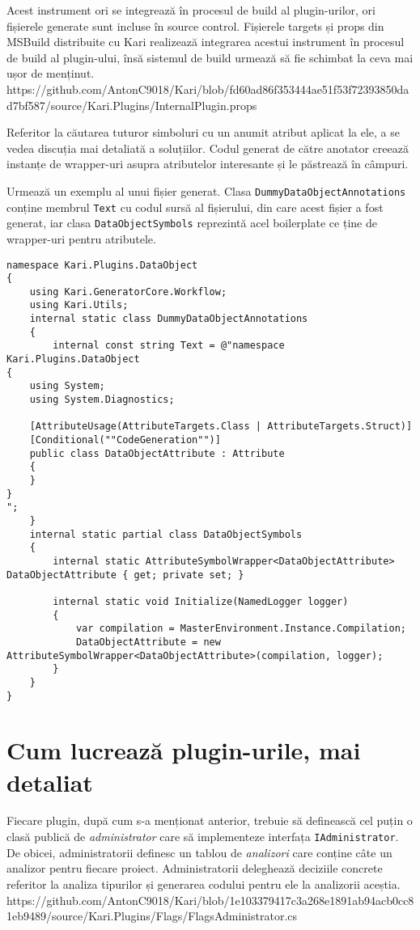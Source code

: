 \documentclass[a4paper,12pt]{report}
\begin{document}
Acest instrument ori se integrează în procesul de build al plugin-urilor, ori fișierele generate sunt incluse în source control.
Fișierele targets și props din MSBuild distribuite cu Kari realizează integrarea acestui instrument în procesul de build al plugin-ului,
însă sistemul de build urmează să fie schimbat la ceva mai ușor de menținut. 
https://github.com/AntonC9018/Kari/blob/fd60ad86f353444ae51f53f72393850dad7bf587/source/Kari.Plugins/InternalPlugin.props


Referitor la căutarea tuturor simboluri cu un anumit atribut aplicat la ele, a se vedea discuția mai detaliată a soluțiilor.
Codul generat de către anotator creează instanțe de wrapper-uri asupra atributelor interesante și le păstrează în câmpuri.\cite{converting_attributes_roslyn}


Urmează un exemplu al unui fișier generat.
Clasa \texttt{DummyDataObjectAnnotations} conține membrul \texttt{Text} cu codul sursă al fișierului, din care acest fișier a fost generat,
iar clasa \texttt{DataObjectSymbols} reprezintă acel boilerplate ce ține de wrapper-uri pentru atributele.

\begin{verbatim}
namespace Kari.Plugins.DataObject
{
    using Kari.GeneratorCore.Workflow;
    using Kari.Utils;
    internal static class DummyDataObjectAnnotations
    {
        internal const string Text = @"namespace Kari.Plugins.DataObject
{
    using System;
    using System.Diagnostics;

    [AttributeUsage(AttributeTargets.Class | AttributeTargets.Struct)]
    [Conditional(""CodeGeneration"")]
    public class DataObjectAttribute : Attribute
    {
    }
}
";
    }
    internal static partial class DataObjectSymbols
    {
        internal static AttributeSymbolWrapper<DataObjectAttribute> DataObjectAttribute { get; private set; }

        internal static void Initialize(NamedLogger logger)
        {
            var compilation = MasterEnvironment.Instance.Compilation;
            DataObjectAttribute = new AttributeSymbolWrapper<DataObjectAttribute>(compilation, logger);
        }
    }
}
\end{verbatim}

\section{Cum lucrează plugin-urile, mai detaliat}

Fiecare plugin, după cum s-a menționat anterior, trebuie să definească cel puțin o clasă publică de \emph{administrator} care să implementeze interfața \texttt{IAdministrator}.
De obicei, administratorii definesc un tablou de \emph{analizori} care conține câte un analizor pentru fiecare proiect.
Administratorii deleghează deciziile concrete referitor la analiza tipurilor și generarea codului pentru ele la analizorii aceștia.
https://github.com/AntonC9018/Kari/blob/1e103379417c3a268e1891ab94acb0cc81eb9489/source/Kari.Plugins/Flags/FlagsAdministrator.cs
\end{document}
